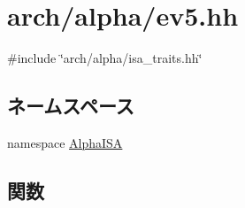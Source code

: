 \hypertarget{ev5_8hh}{
\section{arch/alpha/ev5.hh}
\label{ev5_8hh}
}
{\ttfamily \#include \char`\"{}arch/alpha/isa\_\-traits.hh\char`\"{}}\par
\subsection*{ネームスペース}
\begin{DoxyCompactItemize}
\item 
namespace \hyperlink{namespaceAlphaISA}{AlphaISA}
\end{DoxyCompactItemize}
\subsection*{関数}
